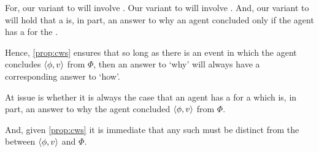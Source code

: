 \begin{note}
  For, our variant to \qWhy{} will involve .
  Our variant to \qHow{} will involve .
  And, our variant to \issueInclusion{} will hold that a \ros{} is, in part, an answer to why an agent concluded only if the agent has a \wit{} for the \ros{}.

  Hence, \autoref{prop:cws} ensures that so long as there is an event in which the agent concludes \(\langle \phi, v \rangle\) from \(\Phi\), then an answer to `why' will always have a corresponding answer to `how'.

  At issue is whether it is always the case that an agent has a \wit{} for a \ros{} which is, in part, an answer to why the agent concluded \(\langle \phi, v \rangle\) from \(\Phi\).

  And, given \autoref{prop:cws} it is immediate that any such \ros{} must be distinct from the \ros{} between \(\langle \phi, v \rangle\) and \(\Phi\).
\end{note}

